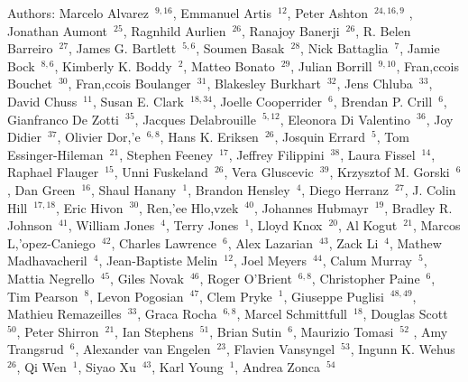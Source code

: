 \documentclass[17pt]{extarticle}
\begin{document}
Authors: 
%
\small{
Marcelo Alvarez~$^{9,16}$,
Emmanuel Artis~$^{12}$,
Peter Ashton~$^{24,16,9}$ ,
Jonathan Aumont~$^{25}$,
Ragnhild Aurlien~$^{26}$,
Ranajoy Banerji~$^{26}$,
R. Belen Barreiro~$^{27}$,
James G. Bartlett~$^{5,6}$,
Soumen Basak~$^{28}$,
Nick Battaglia~$^{7}$,
Jamie Bock~$^{8,6}$,
Kimberly K. Boddy~$^{2}$,
Matteo Bonato~$^{29}$,
Julian Borrill~$^{9,10}$,
Fran,c{c}ois Bouchet~$^{30}$,
Fran,c{c}ois Boulanger~$^{31}$,
Blakesley Burkhart~$^{32}$,
Jens Chluba~$^{33}$,
David Chuss~$^{11}$,
Susan E. Clark~$^{18,34}$,
Joelle Cooperrider~$^{6}$,
Brendan P. Crill~$^{6}$,
Gianfranco De Zotti~$^{35}$,
Jacques Delabrouille~$^{5,12}$,
Eleonora Di Valentino~$^{36}$,
Joy Didier~$^{37}$,
Olivier Dor,'e~$^{6,8}$,
Hans K. Eriksen~$^{26}$,
Josquin Errard~$^{5}$,
Tom Essinger-Hileman~$^{21}$,
Stephen Feeney~$^{17}$,
Jeffrey Filippini~$^{38}$,
Laura Fissel~$^{14}$,
Raphael Flauger~$^{15}$,
Unni Fuskeland~$^{26}$,
Vera Gluscevic~$^{39}$,
Krzysztof M. Gorski~$^{6}$,
Dan Green~$^{16}$,
Shaul Hanany~$^{1}$,
Brandon Hensley~$^{4}$,
Diego Herranz~$^{27}$,
J. Colin Hill~$^{17,18}$,
Eric Hivon~$^{30}$,
Ren,'{e}e  Hlo,v{z}ek~$^{40}$,
Johannes Hubmayr~$^{19}$,
Bradley R. Johnson~$^{41}$,
William Jones~$^{4}$,
Terry Jones~$^{1}$,
Lloyd Knox~$^{20}$,
Al Kogut~$^{21}$,
Marcos L,'{o}pez-Caniego~$^{42}$,
Charles Lawrence~$^{6}$,
Alex Lazarian~$^{43}$,
Zack Li~$^{4}$,
Mathew Madhavacheril~$^{4}$,
Jean-Baptiste Melin~$^{12}$,
Joel Meyers~$^{44}$,
Calum Murray~$^{5}$,
Mattia Negrello~$^{45}$,
Giles Novak~$^{46}$,
Roger O'Brient~$^{6,8}$,
Christopher Paine~$^{6}$,
Tim Pearson~$^{8}$,
Levon Pogosian~$^{47}$,
Clem Pryke~$^{1}$,
Giuseppe Puglisi~$^{48,49}$,
Mathieu Remazeilles~$^{33}$,
Graca Rocha~$^{6,8}$,
Marcel Schmittfull~$^{18}$,
Douglas Scott~$^{50}$,
Peter Shirron~$^{21}$,
Ian Stephens~$^{51}$,
Brian Sutin~$^{6}$,
Maurizio Tomasi~$^{52}$ ,
Amy Trangsrud~$^{6}$,
Alexander van Engelen~$^{23}$,
Flavien Vansyngel~$^{53}$,
Ingunn K. Wehus~$^{26}$,
Qi Wen~$^{1}$,
Siyao Xu~$^{43}$,
Karl Young~$^{1}$,
Andrea Zonca~$^{54}$
}
\\
\vspace{-6pt} 
\end{document}

